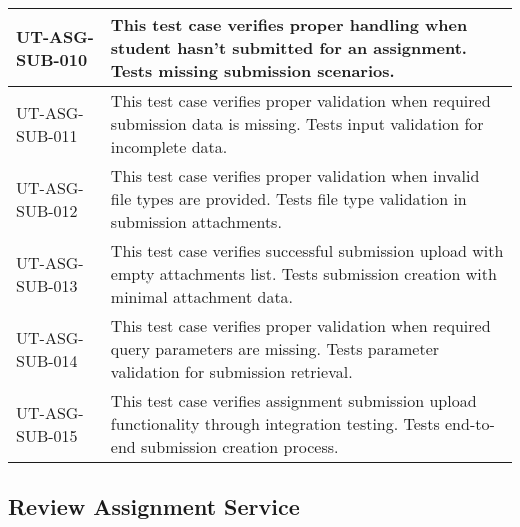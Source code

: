 \begin{longtable}{|p{}|p{}|}
\hline
UT-ASG-SUB-010 & This test case verifies proper handling when student hasn't submitted for an assignment. Tests missing submission scenarios. \\
\hline
UT-ASG-SUB-011 & This test case verifies proper validation when required submission data is missing. Tests input validation for incomplete data. \\
\hline
UT-ASG-SUB-012 & This test case verifies proper validation when invalid file types are provided. Tests file type validation in submission attachments. \\
\hline
UT-ASG-SUB-013 & This test case verifies successful submission upload with empty attachments list. Tests submission creation with minimal attachment data. \\
\hline
UT-ASG-SUB-014 & This test case verifies proper validation when required query parameters are missing. Tests parameter validation for submission retrieval. \\
\hline
UT-ASG-SUB-015 & This test case verifies assignment submission upload functionality through integration testing. Tests end-to-end submission creation process. \\
\hline
\end{longtable}

\subsection{Review Assignment Service}

